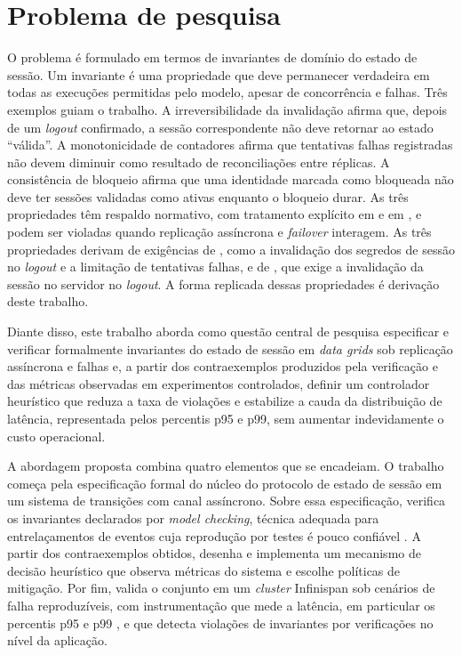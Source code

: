 \section{Problema de pesquisa}
\label{sec-problema}

O problema é formulado em termos de invariantes de domínio do estado de sessão. Um invariante é uma propriedade que deve permanecer verdadeira em todas as execuções permitidas pelo modelo, apesar de concorrência e falhas. Três exemplos guiam o trabalho. A irreversibilidade da invalidação afirma que, depois de um \emph{logout} confirmado, a sessão correspondente não deve retornar ao estado ``válida''. A monotonicidade de contadores afirma que tentativas falhas registradas não devem diminuir como resultado de reconciliações entre réplicas. A consistência de bloqueio afirma que uma identidade marcada como bloqueada não deve ter sessões validadas como ativas enquanto o bloqueio durar. As três propriedades têm respaldo normativo, com tratamento explícito em \citet{nist_sp_800_63b4_2025} e em \citet{owasp_session_mgmt_cheatsheet}, e podem ser violadas quando replicação assíncrona e \emph{failover} interagem. As três propriedades derivam de exigências de \citet{nist_sp_800_63b4_2025}, como a invalidação dos segredos de sessão no \emph{logout} e a limitação de tentativas falhas, e de \citet{owasp_session_mgmt_cheatsheet}, que exige a invalidação da sessão no servidor no \emph{logout}. A forma replicada dessas propriedades é derivação deste trabalho.

Diante disso, este trabalho aborda como questão central de pesquisa especificar e verificar formalmente invariantes do estado de sessão em \emph{data grids} sob replicação assíncrona e falhas e, a partir dos contraexemplos produzidos pela verificação e das métricas observadas em experimentos controlados, definir um controlador heurístico que reduza a taxa de violações e estabilize a cauda da distribuição de latência, representada pelos percentis p95 e p99, sem aumentar indevidamente o custo operacional.

A abordagem proposta combina quatro elementos que se encadeiam. O trabalho começa pela especificação formal do núcleo do protocolo de estado de sessão em um sistema de transições com canal assíncrono. Sobre essa especificação, verifica os invariantes declarados por \emph{model checking}, técnica adequada para entrelaçamentos de eventos cuja reprodução por testes é pouco confiável \citep{newcombe_aws_formal_methods_2015}. A partir dos contraexemplos obtidos, desenha e implementa um mecanismo de decisão heurístico que observa métricas do sistema e escolhe políticas de mitigação.  Por fim, valida o conjunto em um \emph{cluster} Infinispan sob cenários de falha reproduzíveis, com instrumentação que mede a latência, em particular os percentis p95 e p99 \citep{dean_barroso_tail_2013, google_sre_slo}, e que detecta violações de invariantes por verificações no nível da aplicação.

